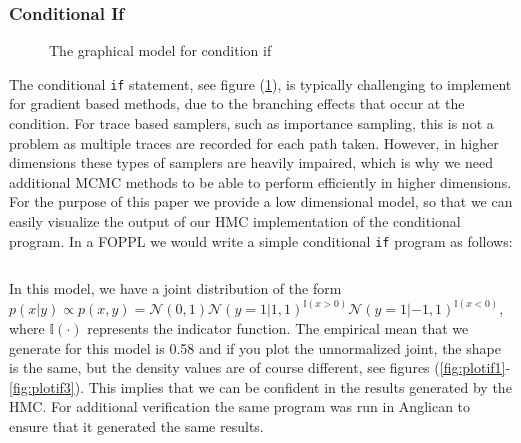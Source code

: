 \subsubsection{Conditional If}
\begin{figure}[ht]
	\begin{center}
		
	\end{center}
	\caption{The graphical model for condition if}
	\label{fig:conif}
\end{figure}
The conditional \texttt{if} statement, see figure (\ref{fig:conif}), is typically challenging to implement for gradient based methods, due to the branching effects that occur at the condition. For trace based samplers, such as importance sampling, this is not a problem as multiple traces are recorded for each path taken. However, in higher dimensions these types of samplers are heavily impaired, which is why we need additional MCMC methods to be able to perform efficiently in higher dimensions. For the purpose of this paper we provide a low dimensional model, so that we can easily visualize the output of our HMC implementation of the conditional program. In a FOPPL we would write a simple conditional \texttt{if} program as follows:\inputminted{clojure}{code/conditionalif.clj}
 In this model, we have a joint distribution of the form $p(x | y) \propto p(x, y) = \mathcal{N}(0,1)\mathcal{N}(y = 1|1,1)^{\mathbb{I}(x > 0)}\mathcal{N}(y = 1|-1,1)^{\mathbb{I}(x < 0)}$, where $\mathbb{I}(\cdot)$ represents the indicator function. The empirical mean that we generate for this model is 0.58 and if you plot the unnormalized joint, the shape is the same, but the density values are of course different, see figures (\ref{fig:plotif1}-\ref{fig:plotif3}). This implies that we can be confident in the results generated by the HMC. For additional verification the same program was run in Anglican \cite{wood2014new} to ensure that it generated the same results. 

